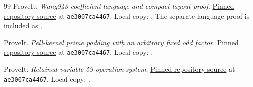\documentclass[11pt,letterpaper]{article}
\theoremstyle{remark}
\begin{document}
\begin{thebibliography}{99}
ProveIt. \emph{Wang943 coefficient language and compact-layout proof}.
\href{https://github.com/VladimirReshetnikov/ProveIt/blob/ae3007ca4467011e0e051c84acb4a1dd13971b0e/SetTheory/Cardinals/docs/reports/hilbert-tenth-problem/con-zfc-diophantine-forms/19-wang943/compiler/WANG943_COMPACT_LAYOUT.md}{Pinned repository source} at \texttt{ae3007ca4467}. Local copy: . The separate language proof is included as .

ProveIt. \emph{Pell-kernel prime padding with an arbitrary fixed odd factor}.
\href{https://github.com/VladimirReshetnikov/ProveIt/blob/ae3007ca4467011e0e051c84acb4a1dd13971b0e/Computability/HilbertTenthProblem/Papers/research-wip/native-stream-queue/pell_kernel_prime_padding.md}{Pinned repository source} at \texttt{ae3007ca4467}. Local copy: .

ProveIt. \emph{Retained-variable 59-operation system}.
\href{https://github.com/VladimirReshetnikov/ProveIt/blob/ae3007ca4467011e0e051c84acb4a1dd13971b0e/SetTheory/Cardinals/docs/reports/hilbert-tenth-problem/con-zfc-diophantine-forms/22-monic12/proofs/RETAINED59_PROOF.md}{Pinned repository source} at \texttt{ae3007ca4467}. Local copy: .

\end{thebibliography}

\end{document}
